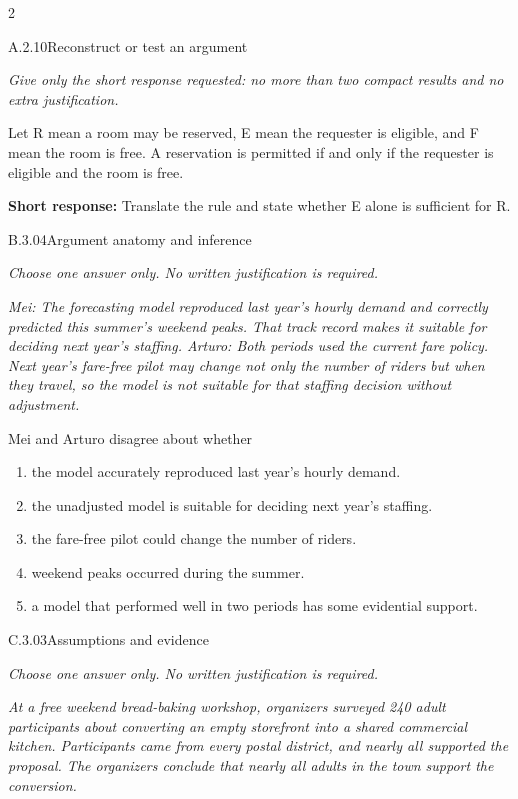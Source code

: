 \documentclass[9pt]{extarticle}
\newcommand{\choice}[1]{\item #1}
\begin{document}
\CoreWorkArea
\FormBreak
{}
\begin{multicols}{2}
\begin{DenseCoreProblem}{A.2.10}{Reconstruct or test an argument}
{\scriptsize\textit{Give only the short response requested: no more than two compact results and no extra justification.}\par}
Let R mean a room may be reserved, E mean the requester is eligible, and F mean the room is free. A reservation is permitted if and only if the requester is eligible and the room is free.

\textbf{Short response:} Translate the rule and state whether E alone is sufficient for R.
\end{DenseCoreProblem}
\begin{DenseCoreProblem}{B.3.04}{Argument anatomy and inference}
{\scriptsize\textit{Choose one answer only. No written justification is required.}\par}
\emph{Mei: The forecasting model reproduced last year's hourly demand and correctly predicted this summer's weekend peaks. That track record makes it suitable for deciding next year's staffing. Arturo: Both periods used the current fare policy. Next year's fare-free pilot may change not only the number of riders but when they travel, so the model is not suitable for that staffing decision without adjustment.}

Mei and Arturo disagree about whether
\begin{enumerate}[label=(\alph*)]
  \choice{the model accurately reproduced last year's hourly demand.}
  \choice{the unadjusted model is suitable for deciding next year's staffing.}
  \choice{the fare-free pilot could change the number of riders.}
  \choice{weekend peaks occurred during the summer.}
  \choice{a model that performed well in two periods has some evidential support.}
\end{enumerate}
\end{DenseCoreProblem}
\columnbreak
\begin{DenseCoreProblem}{C.3.03}{Assumptions and evidence}
{\scriptsize\textit{Choose one answer only. No written justification is required.}\par}
\emph{At a free weekend bread-baking workshop, organizers surveyed 240 adult participants about converting an empty storefront into a shared commercial kitchen. Participants came from every postal district, and nearly all supported the proposal. The organizers conclude that nearly all adults in the town support the conversion.}


\end{DenseCoreProblem}
\end{multicols}
\end{document}
